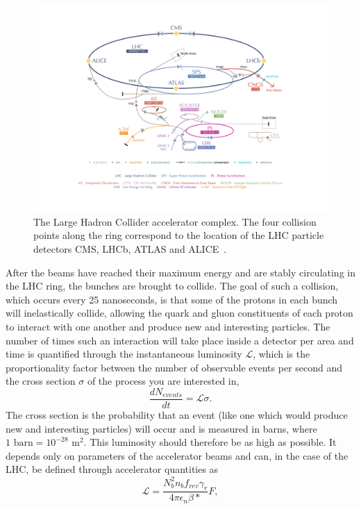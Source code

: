 \begin{figure}[h] 
    \centering
    \includegraphics[width=1.0\textwidth]{figures/cms/LHC.jpg}
    \caption{The Large Hadron Collider accelerator complex. The four collision points along the ring correspond to the location of the LHC particle detectors CMS, LHCb, ATLAS and ALICE~\cite{LHC}.}
    \label{fig:cms:LHC}
\end{figure}
After the beams have reached their maximum energy and are stably circulating in the LHC ring, the bunches are brought to collide. The goal of such a collision, which occurs every 25 nanoseconds, is that some of the protons in each bunch will inelastically collide, allowing the quark and gluon constituents of each proton to interact with one another and produce new and interesting particles.
The number of times such an interaction will take place inside a detector per area and time is quantified through the instantaneous luminosity $\mathcal L$, which is the proportionality factor between the number of observable events per second and the cross section $\sigma$ of the process you are interested in,
\begin{equation}
  \frac{dN_{events}}{dt} =\mathcal L \sigma .
\end{equation}
The cross section is the probability that an event (like one which would produce new and interesting particles) will occur and is measured in barns, where $1 \textrm{ barn} = 10^{-28} \textrm{ m}^2$. This luminosity should therefore be as high as possible. It depends only on parameters of the accelerator beams and can, in the case of the LHC, be defined through accelerator quantities as
\begin{equation}
  \mathcal L = \frac {N_b^2 n_b f_{rev} \gamma_r} {4 \pi \epsilon_n \beta *}F,
\end{equation}
